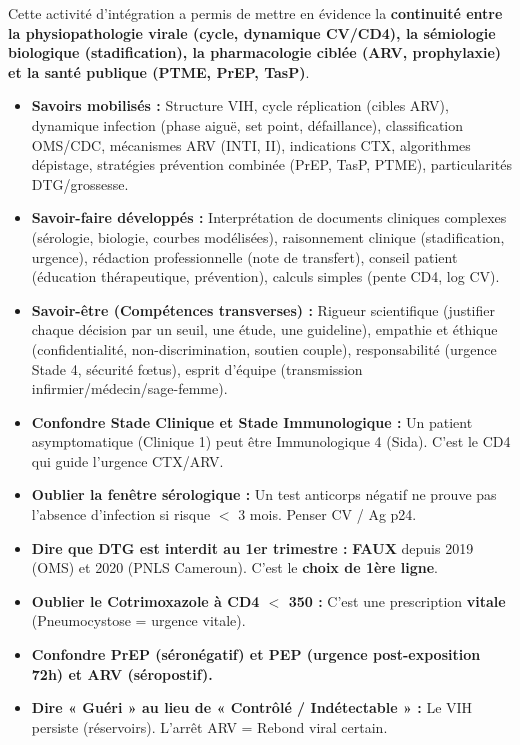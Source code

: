 \documentclass[11pt]{article}
\newcounter{popsec}
\newcounter{popsub}
\newcommand{\courssub}[1]{%
  \stepcounter{popsub}%
  \par\vspace{9pt}\noindent{\popxbold\fontsize{11.5}{13}\selectfont\color{popink}{\color{poporange}\thepopsec.\thepopsub}\hspace{6pt}#1}\par\nopagebreak\vspace{4pt}
}
\begin{document}
\courssub{Bilan de l'activité}
Cette activité d'intégration a permis de mettre en évidence la \textbf{continuité entre la physiopathologie virale (cycle, dynamique CV/CD4), la sémiologie biologique (stadification), la pharmacologie ciblée (ARV, prophylaxie) et la santé publique (PTME, PrEP, TasP)}.

\begin{itemize}
    \item \textbf{Savoirs mobilisés :} Structure VIH, cycle réplication (cibles ARV), dynamique infection (phase aiguë, set point, défaillance), classification OMS/CDC, mécanismes ARV (INTI, II), indications CTX, algorithmes dépistage, stratégies prévention combinée (PrEP, TasP, PTME), particularités DTG/grossesse.
    \item \textbf{Savoir-faire développés :} Interprétation de documents cliniques complexes (sérologie, biologie, courbes modélisées), raisonnement clinique (stadification, urgence), rédaction professionnelle (note de transfert), conseil patient (éducation thérapeutique, prévention), calculs simples (pente CD4, log CV).
    \item \textbf{Savoir-être (Compétences transverses) :} Rigueur scientifique (justifier chaque décision par un seuil, une étude, une guideline), empathie et éthique (confidentialité, non-discrimination, soutien couple), responsabilité (urgence Stade 4, sécurité fœtus), esprit d'équipe (transmission infirmier/médecin/sage-femme).
\end{itemize}

\begin{attention}
\begin{itemize}
    \item \textbf{Confondre Stade Clinique et Stade Immunologique :} Un patient asymptomatique (Clinique 1) peut être Immunologique 4 (Sida). C'est le CD4 qui guide l'urgence CTX/ARV.
    \item \textbf{Oublier la fenêtre sérologique :} Un test anticorps négatif ne prouve pas l'absence d'infection si risque $<$ 3 mois. Penser CV / Ag p24.
    \item \textbf{Dire que DTG est interdit au 1er trimestre :} \textbf{FAUX} depuis 2019 (OMS) et 2020 (PNLS Cameroun). C'est le \textbf{choix de 1ère ligne}.
    \item \textbf{Oublier le Cotrimoxazole à CD4 $<$ 350 :} C'est une prescription \textbf{vitale} (Pneumocystose = urgence vitale).
    \item \textbf{Confondre PrEP (séronégatif) et PEP (urgence post-exposition 72h) et ARV (séropostif).}
    \item \textbf{Dire « Guéri » au lieu de « Contrôlé / Indétectable » :} Le VIH persiste (réservoirs). L'arrêt ARV = Rebond viral certain.
\end{itemize}

\end{attention}
\end{document}
